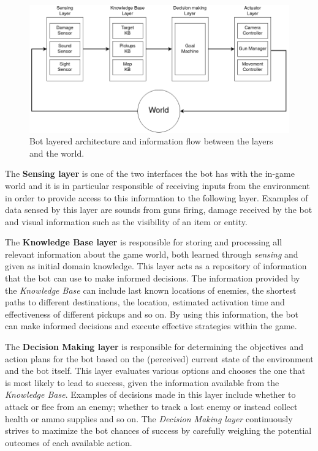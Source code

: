 \begin{figure}
\centering
\includegraphics[width=0.8\linewidth]{Images/images/LayeredArchitecture.drawio.png}
\caption{Bot layered architecture and information flow between the layers and the world.}
\label{fig:modular_layered_bot}
\end{figure}

The \textbf{Sensing layer} is one of the two interfaces the bot has with the in-game world and it is in particular responsible  of receiving inputs from the environment in order to provide access to this information to the following layer. Examples of data sensed by this layer are sounds from guns firing, damage received by the bot and visual information such as the visibility of an item or entity.

The \textbf{Knowledge Base layer} is responsible for storing and processing all relevant information about the game world, both learned through \textit{sensing} and given as initial domain knowledge. This layer acts as a repository of information that the bot can use to make informed decisions. The information provided by the \textit{Knowledge Base} can include last known locations of enemies, the shortest paths to different destinations, the location, estimated activation time and effectiveness of different pickups and so on. By using this information, the bot can make informed decisions and execute effective strategies within the game.

The \textbf{Decision Making layer} is responsible for determining the objectives and action plans for the bot based on the (perceived) current state of the environment and the bot itself. This layer evaluates various options and chooses the one that is most likely to lead to success, given the information available from the \textit{Knowledge Base}. Examples of decisions made in this layer include whether to attack or flee from an enemy; whether to track a lost enemy or instead collect health or ammo supplies and so on. The \textit{Decision Making layer} continuously strives to maximize the bot chances of success by carefully weighing the potential outcomes of each available action.

